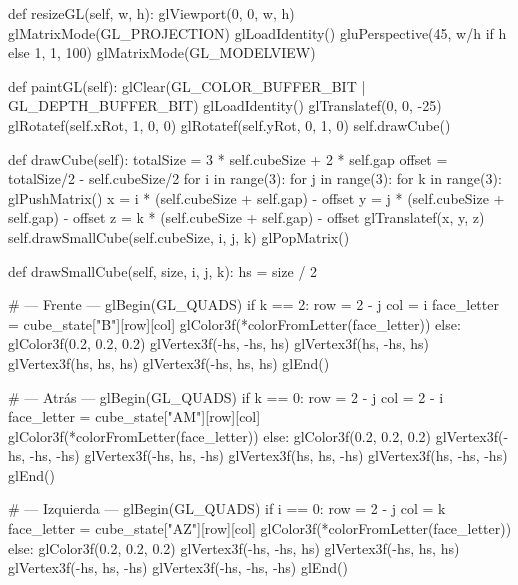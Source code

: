     def resizeGL(self, w, h):
        glViewport(0, 0, w, h)
        glMatrixMode(GL_PROJECTION)
        glLoadIdentity()
        gluPerspective(45, w/h if h else 1, 1, 100)
        glMatrixMode(GL_MODELVIEW)

    def paintGL(self):
        glClear(GL_COLOR_BUFFER_BIT | GL_DEPTH_BUFFER_BIT)
        glLoadIdentity()
        glTranslatef(0, 0, -25)
        glRotatef(self.xRot, 1, 0, 0)
        glRotatef(self.yRot, 0, 1, 0)
        self.drawCube()
        

    def drawCube(self):
        totalSize = 3 * self.cubeSize + 2 * self.gap
        offset = totalSize/2 - self.cubeSize/2
        for i in range(3):
            for j in range(3):
                for k in range(3):
                    glPushMatrix()
                    x = i * (self.cubeSize + self.gap) - offset
                    y = j * (self.cubeSize + self.gap) - offset
                    z = k * (self.cubeSize + self.gap) - offset
                    glTranslatef(x, y, z)
                    self.drawSmallCube(self.cubeSize, i, j, k)
                    glPopMatrix()
                    

    def drawSmallCube(self, size, i, j, k):
        hs = size / 2

        # --- Frente  ---
        glBegin(GL_QUADS)
        if k == 2:
            row = 2 - j
            col = i
            face_letter = cube_state["B"][row][col]
            glColor3f(*colorFromLetter(face_letter))
        else:
            glColor3f(0.2, 0.2, 0.2)
        glVertex3f(-hs, -hs, hs)
        glVertex3f(hs, -hs, hs)
        glVertex3f(hs, hs, hs)
        glVertex3f(-hs, hs, hs)
        glEnd()

        # --- Atrás ---
        glBegin(GL_QUADS)
        if k == 0:
            row = 2 - j
            col = 2 - i
            face_letter = cube_state["AM"][row][col]
            glColor3f(*colorFromLetter(face_letter))
        else:
            glColor3f(0.2, 0.2, 0.2)
        glVertex3f(-hs, -hs, -hs)
        glVertex3f(-hs, hs, -hs)
        glVertex3f(hs, hs, -hs)
        glVertex3f(hs, -hs, -hs)
        glEnd()

        # --- Izquierda ---
        glBegin(GL_QUADS)
        if i == 0:
            row = 2 - j
            col = k
            face_letter = cube_state["AZ"][row][col]
            glColor3f(*colorFromLetter(face_letter))
        else:
            glColor3f(0.2, 0.2, 0.2)
        glVertex3f(-hs, -hs, hs)
        glVertex3f(-hs, hs, hs)
        glVertex3f(-hs, hs, -hs)
        glVertex3f(-hs, -hs, -hs)
        glEnd()

